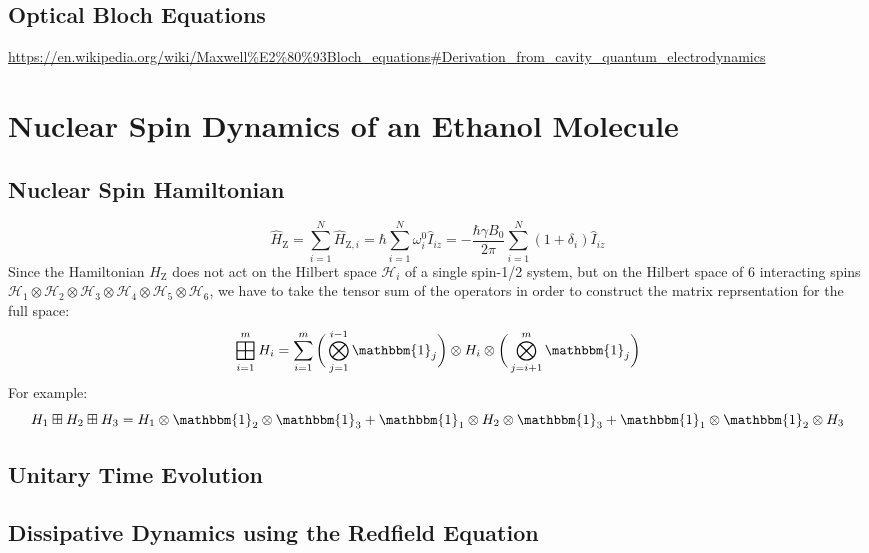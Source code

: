 \documentclass[9pt]{report}
\newcommand{\op}{
	\mathop{
		\vphantom{\bigoplus} 
		\mathchoice
		{\vcenter{\hbox{\resizebox{\widthof{$\displaystyle\bigoplus$}}{!}{$\boxplus$}}}}
		{\vcenter{\hbox{\resizebox{\widthof{$\bigoplus$}}{!}{$\boxplus$}}}}
		{\vcenter{\hbox{\resizebox{\widthof{$\scriptstyle\oplus$}}{!}{$\boxplus$}}}}
		{\vcenter{\hbox{\resizebox{\widthof{$\scriptscriptstyle\oplus$}}{!}{$\boxplus$}}}}
	}\displaylimits 
}
\begin{document}
\subsection{Optical Bloch Equations}
\url{https://en.wikipedia.org/wiki/Maxwell%E2%80%93Bloch_equations#Derivation_from_cavity_quantum_electrodynamics}







\newpage
\section{Nuclear Spin Dynamics of an Ethanol Molecule}

\subsection{Nuclear Spin Hamiltonian}
\begin{equation}
\hat{H}_{\mathrm{Z}}=\displaystyle\sum_{i=1}^{N}\hat{H}_{\mathrm{Z},i}=\hbar\displaystyle\sum_{i=1}^{N}\omega_{i}^{0}\hat{I}_{iz}=-\frac{\hbar\gamma B_{0}}{2\pi}\displaystyle\sum_{i=1}^{N}(1+\delta_{i})\hat{I}_{iz}
\end{equation}
Since the Hamiltonian $\hat{H}_{\mathrm{Z}}$ does not act on the Hilbert space $\mathcal{H}_i$ of a single spin-1/2 system, but on the Hilbert space of 6 interacting spins $\mathcal{H}_1\otimes\mathcal{H}_2\otimes\mathcal{H}_3\otimes\mathcal{H}_4\otimes\mathcal{H}_5\otimes\mathcal{H}_6$, we have to take the tensor sum of the operators in order to construct the matrix reprsentation for the full space:
\begin{equation}
\op_{i=1}^{m}H_i = \sum_{i=1}^{m}\bigg(\bigotimes_{j=1}^{i-1}\mathbbm{1}_j\bigg)\otimes H_i\otimes\bigg(\bigotimes_{j=i+1}^{m}\mathbbm{1}_j\bigg)
\end{equation}
For example:
\begin{equation}
H_1\boxplus H_2\boxplus H_3 = H_1\otimes\mathbbm{1}_2\otimes\mathbbm{1}_3 + \mathbbm{1}_1\otimes H_2\otimes\mathbbm{1}_3 + \mathbbm{1}_1\otimes\mathbbm{1}_2\otimes H_3
\end{equation}

\subsection{Unitary Time Evolution}

\subsection{Dissipative Dynamics using the Redfield Equation}
\end{document}
